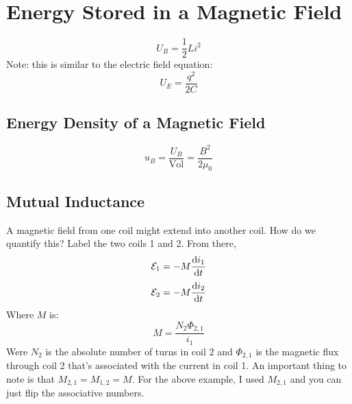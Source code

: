 \documentclass[]{article}
\begin{document}
\section{Energy Stored in a Magnetic Field}
\[ U_B = \frac{1}{2} L i^2 \]
Note: this is similar to the electric field equation:
\[ U_E = \frac{q^2}{2C} \]

\subsection{Energy Density of a Magnetic Field}
\[ u_B = \frac{U_B}{\text{Vol}} = \frac{B^2}{2\mu_0} \]

\subsection{Mutual Inductance}
A magnetic field from one coil might extend into another coil. How do we quantify this? Label the two coils 1 and 2. From there,
\[ \mathcal{E}_1 = -M \dv{i_1}{t} \]
\[ \mathcal{E}_2 = -M \dv{i_2}{t} \]
Where $ M $ is:
\[ M = \frac{N_2\Phi_{2,1}}{i_1} \]
Were $ N_2 $ is the absolute number of turns in coil 2 and $ \Phi_{2,1} $ is the magnetic flux through coil 2 that's associated with the current in coil 1. An important thing to note is that $ M_{2,1} = M_{1,2} = M $. For the above example, I used $ M_{2,1} $ and you can just flip the associative numbers.
\end{document}
